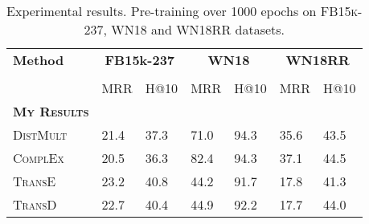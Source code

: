 \begin{table}[H]
    \centering
    \begin{tabular}{lllllll}
        \toprule
        \textbf{Method} &
        \multicolumn{2}{c}{\textbf{FB15k-237}} & 
        \multicolumn{2}{c}{\textbf{WN18}} & 
        \multicolumn{2}{c}{\textbf{WN18RR}}\\
        
        \cmidrule{2-6} \cmidrule{7-7} \\
        {} & MRR & H@10 & MRR & H@10 & MRR & H@10 \\
        
        \midrule
         
        \textbf{\textsc{My Results}} 
        &  &  &  &  &  & \\
        
       \textsc{DistMult}  
        & 21.4 & 37.3 & 71.0 & 94.3 & 35.6 & 43.5 \\
        
        \textsc{ComplEx}   
        & 20.5 & 36.3 & 82.4 & 94.3 & 37.1 & 44.5 \\
         
        \textsc{TransE}    
        & 23.2 & 40.8 & 44.2 & 91.7 & 17.8 & 41.3 \\
        
        \textsc{TransD}    
        & 22.7 & 40.4 & 44.9 & 92.2 & 17.7 & 44.0 \\ 
        \bottomrule
    \end{tabular}
    \caption{Experimental results.
    Pre-training over 1000 epochs on \textsc{FB15k-237},
  \textsc{WN18} and \textsc{WN18RR} datasets.}
\label{tab:result_table2_pretraining}
\end{table}